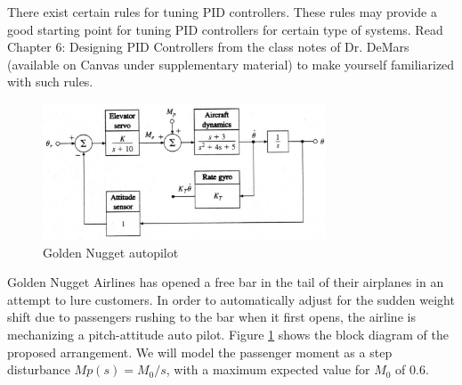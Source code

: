 \documentclass[10.5pt,letter]{exam}
\newcommand{\ans}[1]{\textcolor{blue}{#1}}
\begin{document}
\begin{questions}
\question[4] There exist certain rules for tuning PID controllers. These rules may provide a good starting point for tuning PID controllers for certain type of systems. Read Chapter 6: Designing PID Controllers from the class notes of Dr. DeMars (available on Canvas under supplementary material) to make yourself familiarized with such rules. 

\begin{figure}[hbt!]
    \centering
    \includegraphics[width=0.75\textwidth]{AERO_422_HW5_P6.png}
    \caption{Golden Nugget autopilot}
    \label{fig:GoldenNugget}
\end{figure}

\question[Bonus] Golden Nugget Airlines has opened a free bar in the tail of their airplanes
in an attempt to lure customers. In order to automatically adjust for the
sudden weight shift due to passengers rushing to the bar when it first
opens, the airline is mechanizing a pitch-attitude auto pilot. Figure \ref{fig:GoldenNugget}
shows the block diagram of the proposed arrangement. We will model the
passenger moment as a step disturbance $Mp(s) = M_0/s$, with a maximum
expected value for $M_0$ of 0.6.
\end{questions}
\end{document}
